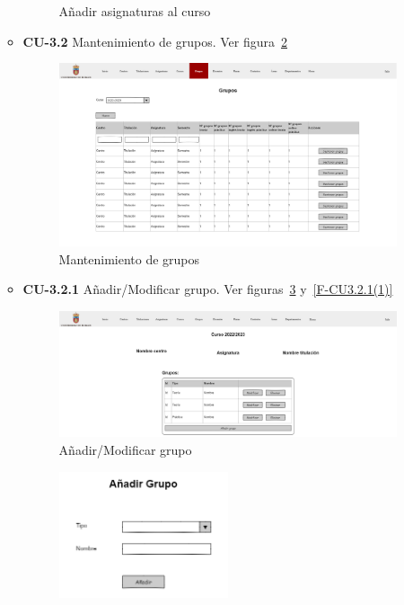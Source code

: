 \begin{itemize}
\begin{itemize}
\begin{figure}[!h]
		\caption{Añadir asignaturas al curso}\label{F-CU3.1.2(1)}
		\end{figure}
		\FloatBarrier
\newpage
		\item \textbf{CU-3.2} Mantenimiento de grupos. Ver figura~\ref{F-CU3.2} 
		\begin{figure}[!h]
		\centering
		\includegraphics[width=\textwidth]{../img/Anexos/Vistas/grupos.png}
		\caption{Mantenimiento de grupos}\label{F-CU3.2}
		\end{figure}
		\FloatBarrier
		\item \textbf{CU-3.2.1} Añadir/Modificar grupo. Ver figuras~\ref{F-CU3.2.1} y~\ref{F-CU3.2.1(1)}  
		\begin{figure}[!h]
		\centering
		\includegraphics[width=\textwidth]{../img/Anexos/Vistas/addmod_grupo.png}
		\caption{Añadir/Modificar grupo}\label{F-CU3.2.1}
		\end{figure}
		\FloatBarrier
		\begin{figure}[!h]
		\centering
		\includegraphics[width=0.5\textwidth]{../img/Anexos/Vistas/add_grupo.png}

\end{figure}
\end{itemize}
\end{itemize}
